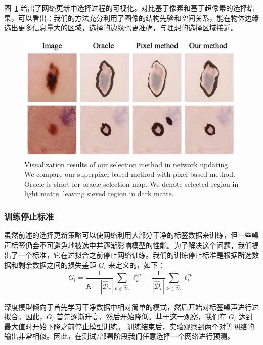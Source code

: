 图~\ref{fig:vis_select} 给出了网络更新中选择过程的可视化。对比基于像素和基于超像素的选择结果，可以看出：我们的方法充分利用了图像的结构先验和空间关系，能在物体边缘选出更多信息量大的区域，选择的边缘也更准确，与理想的选择区域接近。

    \begin{figure}[tbp]
        \centering 
        \includegraphics[width=1.0\textwidth]{img/c4/b_select2.png}
        {Visualization results of our selection method in network updating. We compare our superpixel-based method with pixel-based method. Oracle is short for oracle selection map. We denote selected region in light matte, leaving sieved region in dark matte. }
        \label{fig:vis_select}
    \end{figure}

\subsubsection{训练停止标准}
虽然前述的选择更新策略可以使网络利用大部分干净的标签数据来训练，但一些噪声标签仍会不可避免地被选中并逐渐影响模型的性能。为了解决这个问题，我们提出了一个标准，它在过拟合之前停止网络训练。我们的训练停止标准是根据所选数据和剩余数据之间的损失差距 $G_l$ 来定义的，如下：
\begin{equation}\label{loss_gap}
	G_{l} =    \frac{1}{K-|\mathcal{\hat{D}}_c|}\sum_{k \notin \mathcal{\hat{D}}_c}\ell_k^{sp} - \frac{1}{|\mathcal{\hat{D}}_c|}\sum_{k \in \mathcal{\hat{D}}_c}\ell_k^{sp} 
\end{equation}

深度模型倾向于首先学习干净数据中相对简单的模式，然后开始对标签噪声进行过拟合\citep{arpit2017closer}。因此，$G_{l}$ 首先逐渐升高，然后开始降低。基于这一观察，我们在 $G_{l}$ 达到最大值时开始下降之前停止模型训练。
训练结束后，实验观察到两个对等网络的输出非常相似。因此，在测试/部署阶段我们任意选择一个网络进行预测。

